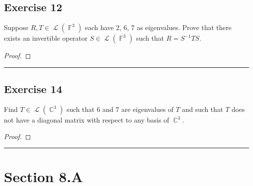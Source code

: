 \documentclass[letterpaper, 12pt]{amsart}
\DeclareMathOperator{\F}{\mathbb{F}}				%
\DeclareMathOperator{\C}{\mathbb{C}}				%
\DeclareMathOperator{\Ell}{\mathscr{L}}				%
\theoremstyle{definition}  							%
\begin{document}
		\subsection*{Exercise 12}
		Suppose $R,T \in \Ell(\F^{3})$ each have 2, 6, 7 as eigenvalues. 
		Prove that there exists an invertible operator $S \in \Ell(\F^{3})$ such that $R = S^{-1}TS$.
		\vspace*{3mm}

		\begin{proof}
		\end{proof}

		\vspace*{2mm}
		\hrule
		\vspace*{2mm}

		\subsection*{Exercise 14}
		Find $T \in \Ell(\C^{3})$ such that 6 and 7 are eigenvalues of $T$ and such that $T$ does not have a diagonal matrix with respect to any basis of $\C^{3}$.
		\vspace*{3mm}

		\begin{proof}
		\end{proof}
		\vspace*{2mm}
		\hrule
		\vspace*{2mm}

	\section*{Section 8.A}
\end{document}
